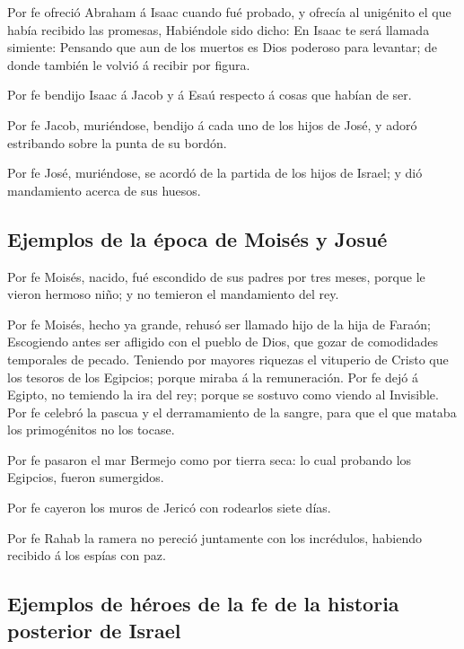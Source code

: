  Por fe ofreció Abraham á Isaac cuando fué probado, y
ofrecía al unigénito el que había recibido las promesas, 
Habiéndole sido dicho: En Isaac te será llamada simiente:
 Pensando que aun de los muertos es Dios poderoso para
levantar; de donde también le volvió á recibir por figura.

 Por fe bendijo Isaac á Jacob y á Esaú respecto á cosas
que habían de ser.

 Por fe Jacob, muriéndose, bendijo á cada uno de los
hijos de José, y adoró estribando sobre la punta de su bordón.

 Por fe José, muriéndose, se acordó de la partida de los
hijos de Israel; y dió mandamiento acerca de sus huesos.

\hypertarget{ejemplos-de-la-uxe9poca-de-moisuxe9s-y-josuuxe9}{%
\subsection{Ejemplos de la época de Moisés y
Josué}\label{ejemplos-de-la-uxe9poca-de-moisuxe9s-y-josuuxe9}}

 Por fe Moisés, nacido, fué escondido de sus padres por
tres meses, porque le vieron hermoso niño; y no temieron el mandamiento
del rey.

 Por fe Moisés, hecho ya grande, rehusó ser llamado hijo
de la hija de Faraón;  Escogiendo antes ser afligido con
el pueblo de Dios, que gozar de comodidades temporales de pecado.
 Teniendo por mayores riquezas el vituperio de Cristo que
los tesoros de los Egipcios; porque miraba á la remuneración.
 Por fe dejó á Egipto, no temiendo la ira del rey; porque
se sostuvo como viendo al Invisible.  Por fe celebró la
pascua y el derramamiento de la sangre, para que el que mataba los
primogénitos no los tocase.

 Por fe pasaron el mar Bermejo como por tierra seca: lo
cual probando los Egipcios, fueron sumergidos.

 Por fe cayeron los muros de Jericó con rodearlos siete
días.

 Por fe Rahab la ramera no pereció juntamente con los
incrédulos, habiendo recibido á los espías con paz.

\hypertarget{ejemplos-de-huxe9roes-de-la-fe-de-la-historia-posterior-de-israel}{%
\subsection{Ejemplos de héroes de la fe de la historia posterior de
Israel}\label{ejemplos-de-huxe9roes-de-la-fe-de-la-historia-posterior-de-israel}}

